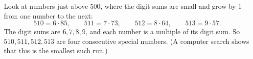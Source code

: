 Look at numbers just above $500$, where the digit sums are small and grow by $1$ from one number to the next:
\[
510=6\cdot85,\qquad 511=7\cdot73,\qquad 512=8\cdot64,\qquad 513=9\cdot57 .
\]
The digit sums are $6,7,8,9$, and each number is a multiple of its digit sum. So $\boxed{510,511,512,513}$ are four consecutive special numbers. (A computer search shows that this is the smallest such run.)
